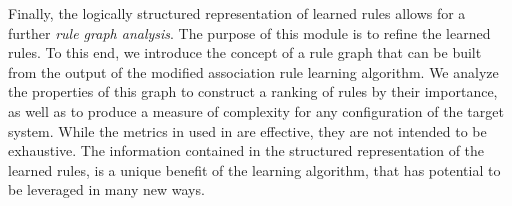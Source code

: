 Finally, the logically structured representation of learned rules allows for a further \textit{rule graph analysis}.
The purpose of this module is to refine the learned rules.
To this end, we introduce the concept of a rule graph that can be built from the output of the modified association rule learning algorithm.
We analyze the properties of this graph to construct a ranking of rules by their importance, 
  as well as to produce a measure of complexity for any configuration of the target system.
While the metrics in used in \app are effective, they are not intended to be exhaustive.
The information contained in the structured representation of the learned rules, 
  is a unique benefit of the learning algorithm, that has potential to be leveraged in many new ways.

